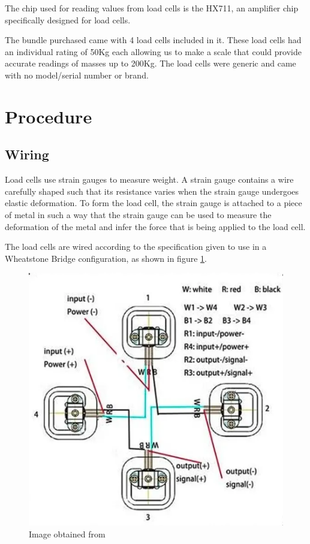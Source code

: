 \documentclass[letterpaper,11pt]{article}
\newcommand{\myLink}[2]{\href{#1}{\color{blue}\underline{\smash{\texttt{#2}}}}}
\begin{document}
The chip used for reading values from load cells is the HX711, an amplifier chip
specifically designed for load cells.

The bundle purchased came with 4 load cells included in it. These load cells had
an individual rating of 50Kg each allowing us to make a scale that could provide
accurate readings of masses up to 200Kg. The load cells were generic and came
with no model/serial number or brand.

\section{Procedure}
\subsection{Wiring}
Load cells use strain gauges to measure weight. A strain gauge contains a wire
carefully shaped such that its resistance varies when the strain gauge undergoes
elastic deformation. To form the load cell, the strain gauge is attached to a
piece of metal in such a way that the strain gauge can be used to measure the
deformation of the metal and infer the force that is being applied to the load
cell.

The load cells are wired according to the specification given to use in a
Wheatstone Bridge configuration, as shown in figure \ref{img:banggood}.

\begin{figure}[h]
  \centering
  \includegraphics[scale=.5]{loadcellwiring}
  \caption{Image obtained from
    \myLink{https://www.banggood.com/4pcs-DIY-50KG-Body-Load-Cell-Weight-Strain-Sensor-Resistance-With-HX711-AD-Module-p-1326815.html}{Bang
      Good}}
  \label{img:banggood}
\end{figure}
\end{document}
